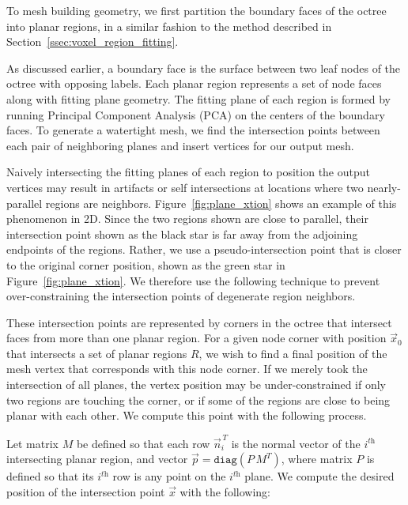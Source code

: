\documentclass[12pt,onecolumn,oneside]{book}
\begin{document}


To mesh building geometry, we first partition the boundary faces of the octree into planar regions, in a similar fashion to the method described in Section~\ref{ssec:voxel_region_fitting}.  

As discussed earlier, a boundary face is the surface between two leaf nodes of the octree with opposing labels.  Each planar region represents a set of node faces along with fitting plane geometry.  The fitting plane of each region is formed by running Principal Component Analysis (PCA) on the centers of the boundary faces.  To generate a watertight mesh, we find the intersection points between each pair of neighboring planes and insert vertices for our output mesh.  

Naively intersecting the fitting planes of each region to position the output vertices may result in artifacts or self intersections at locations where two nearly-parallel regions are neighbors.  Figure~\ref{fig:plane_xtion} shows an example of this phenomenon in 2D.  Since the two regions shown are close to parallel, their intersection point shown as the black star is far away from the adjoining endpoints of the regions.  Rather, we use a pseudo-intersection point that is closer to the original corner position, shown as the green star in Figure~\ref{fig:plane_xtion}.  We therefore use the following technique to prevent over-constraining the intersection points of degenerate region neighbors.

These intersection points are represented by corners in the octree that intersect faces from more than one planar region.  For a given node corner with position $\vec{x}_0$ that intersects a set of planar regions $R$, we wish to find a final position of the mesh vertex that corresponds with this node corner.  If we merely took the intersection of all planes, the vertex position may be under-constrained if only two regions are touching the corner, or if some of the regions are close to being planar with each other.  
We compute this point with the following process.

Let matrix $M$ be defined so that each row $\vec{n}_i^{\,T}$ is the normal vector of the $i^{\textit{th}}$ intersecting planar region, and vector $\vec{p} = \texttt{diag}(P\,M^T)$, where matrix $P$ is defined so that its $i^{\textit{th}}$ row is any point on the $i^{\textit{th}}$ plane.  We compute the desired position of the intersection point $\vec{x}$ with the following:
\end{document}
